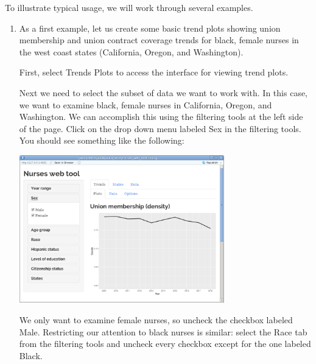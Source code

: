 \documentclass[letterpaper,12pt]{article}
\begin{document}
To illustrate typical usage, we will work through several examples.
\begin{enumerate}
\item As a first example, let us create some basic trend plots showing
  union membership and union contract coverage trends for black,
  female nurses in the west coast states (California, Oregon, and
  Washington).

  First, select Trends \textrightarrow{} Plots to access the interface
  for viewing trend plots.

  Next we need to select the subset of data we want to work with. In
  this case, we want to examine black, female nurses in California,
  Oregon, and Washington. We can accomplish this using the filtering
  tools at the left side of the page. Click on the drop down menu
  labeled Sex in the filtering tools. You should see something like
  the following:
  \begin{center}
    \includegraphics[width=0.7\textwidth]{images/trends_ex1/sex_selection.png}
  \end{center}
  We only want to examine female nurses, so uncheck the checkbox
  labeled Male. Restricting our attention to black nurses is similar:
  select the Race tab from the filtering tools and uncheck every
  checkbox except for the one labeled Black.


\end{enumerate}
\end{document}
